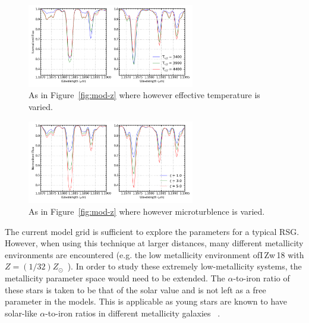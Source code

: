 \begin{figure}
 \centering
\includegraphics[width=0.65\textwidth]{JAnal/varyTv2}
\caption{
As in Figure~\ref{fig:mod-z} where however effective temperature is varied.\label{fig:mod-t}
         }
\end{figure}

\begin{figure}
 \centering
\includegraphics[width=0.65\textwidth]{JAnal/varymicrov2}
\caption{
As in Figure~\ref{fig:mod-z} where however microturblence is varied.\label{fig:mod-micro}
         }
\end{figure}

The current model grid is sufficient to explore the parameters for a typical RSG.
However, when using this technique at larger distances,
many different metallicity environments are encountered (e.g. the low metallicity environment ofI\,Zw\,18 with $Z=(1/32)Z_{\odot}$~\citep{1998ApJ...508..248V}).
In order to study these extremely low-metallicity systems,
the metallicity parameter space would need to be extended.
The $\alpha$-to-iron ratio of these stars is taken to be that of the solar value and is not left as a free parameter in the models.
This is applicable as young stars are known to have solar-like $\alpha$-to-iron ratios in different metallicity galaxies
~\citep[see tables 3 and 4 in][and references therein]{2015ApJ...806...21D}.

